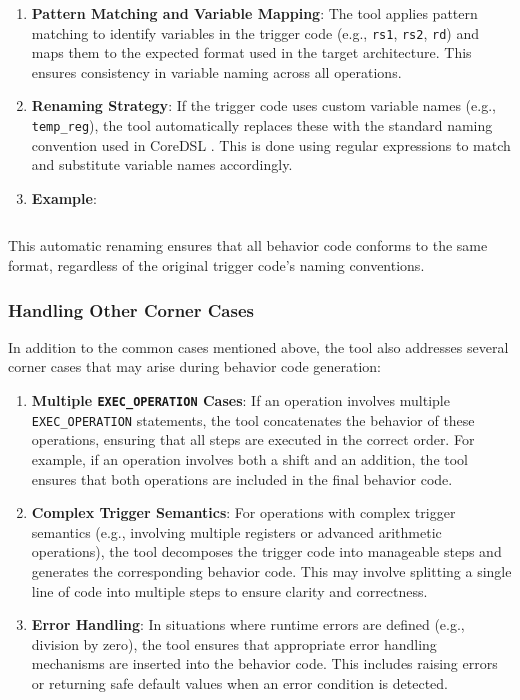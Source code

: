 \begin{enumerate}
    \item \textbf{Pattern Matching and Variable Mapping}: The tool applies pattern matching to identify variables in the trigger code (e.g., \texttt{rs1}, \texttt{rs2}, \texttt{rd}) and maps them to the expected format used in the target architecture. This ensures consistency in variable naming across all operations.

    \item \textbf{Renaming Strategy}: If the trigger code uses custom variable names (e.g., \texttt{temp\_reg}), the tool automatically replaces these with the standard naming convention used in CoreDSL . This is done using regular expressions to match and substitute variable names accordingly.

    \item \textbf{Example}:
    \begin{lstlisting}

    \end{lstlisting}
\end{enumerate}

This automatic renaming ensures that all behavior code conforms to the same format, regardless of the original trigger code's naming conventions.

\subsubsection{Handling Other Corner Cases}

In addition to the common cases mentioned above, the tool also addresses several corner cases that may arise during behavior code generation:

\begin{enumerate}
    \item \textbf{Multiple \texttt{EXEC\_OPERATION} Cases}: If an operation involves multiple \texttt{EXEC\_OPERATION} statements, the tool concatenates the behavior of these operations, ensuring that all steps are executed in the correct order. For example, if an operation involves both a shift and an addition, the tool ensures that both operations are included in the final behavior code.

    \item \textbf{Complex Trigger Semantics}: For operations with complex trigger semantics (e.g., involving multiple registers or advanced arithmetic operations), the tool decomposes the trigger code into manageable steps and generates the corresponding behavior code. This may involve splitting a single line of code into multiple steps to ensure clarity and correctness.

    \item \textbf{Error Handling}: In situations where runtime errors are defined (e.g., division by zero), the tool ensures that appropriate error handling mechanisms are inserted into the behavior code. This includes raising errors or returning safe default values when an error condition is detected.
\end{enumerate}

